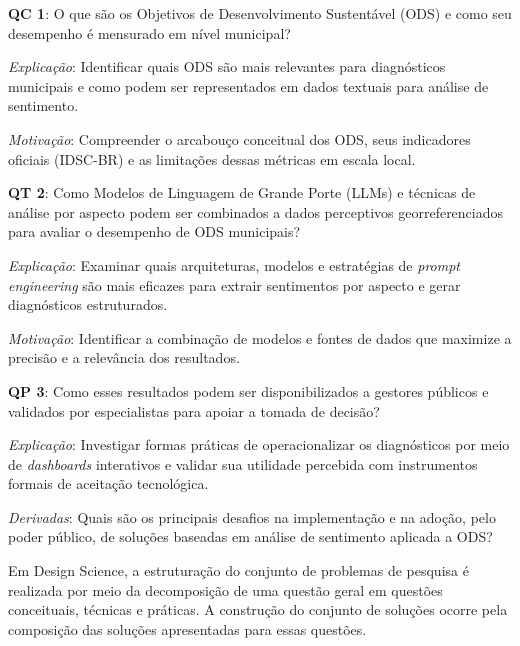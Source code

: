 {\begin{alineas}
    \item \textbf{QC 1}: O que são os Objetivos de Desenvolvimento Sustentável (ODS) e como seu desempenho é mensurado em nível municipal?
    \begin{alineas}
        \item \textit{Explicação}: Identificar quais ODS são mais relevantes para diagnósticos municipais e como podem ser representados em dados textuais para análise de sentimento.
        \item \textit{Motivação}: Compreender o arcabouço conceitual dos ODS, seus indicadores oficiais (IDSC-BR) e as limitações dessas métricas em escala local.
    \end{alineas}
    \item \textbf{QT 2}: Como Modelos de Linguagem de Grande Porte (LLMs) e técnicas de análise por aspecto podem ser combinados a dados perceptivos georreferenciados para avaliar o desempenho de ODS municipais?
    \begin{alineas}
        \item \textit{Explicação}: Examinar quais arquiteturas, modelos e estratégias de \textit{prompt engineering} são mais eficazes para extrair sentimentos por aspecto e gerar diagnósticos estruturados.
        \item \textit{Motivação}: Identificar a combinação de modelos e fontes de dados que maximize a precisão e a relevância dos resultados.
    \end{alineas}
    \item \textbf{QP 3}: Como esses resultados podem ser disponibilizados a gestores públicos e validados por especialistas para apoiar a tomada de decisão?
    \begin{alineas}
        \item \textit{Explicação}: Investigar formas práticas de operacionalizar os diagnósticos por meio de \textit{dashboards} interativos e validar sua utilidade percebida com instrumentos formais de aceitação tecnológica.
        \item \textit{Derivadas}: Quais são os principais desafios na implementação e na adoção, pelo poder público, de soluções baseadas em análise de sentimento aplicada a ODS?
    \end{alineas}
\end{alineas}

Em Design Science, a estruturação do conjunto de problemas de pesquisa é
realizada por meio da decomposição de uma questão geral em questões
conceituais, técnicas e práticas. A construção do conjunto de soluções
ocorre pela composição das soluções apresentadas para essas questões.

}
